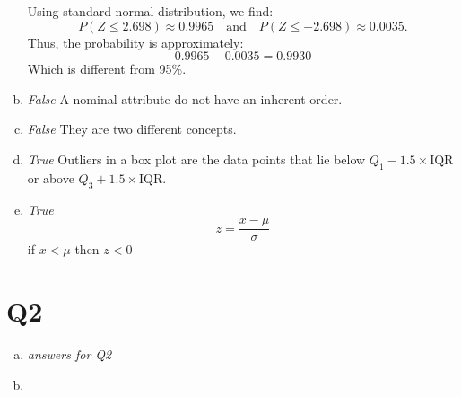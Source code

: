 \documentclass[11pt]{article}
\begin{document}
\begin{enumerate}[a.]
		Using standard normal distribution, we find:
		\[
			P(Z \le 2.698) \approx 0.9965 \quad \text{and} \quad P(Z \le -2.698) \approx 0.0035.
		\]
		Thus, the probability is approximately:
		\[
			0.9965 - 0.0035 = 0.9930 
		\]
		Which is different from 95\%.
	\item
		\textit{False}
		A nominal attribute do not have an inherent order.
	\item
		\textit{False}
		They are two different concepts.
	\item
		\textit{True}
		Outliers in a box plot are the data points that lie below \(Q_1 - 1.5
		\times \text{IQR}\) or above \(Q_3 + 1.5 \times \text{IQR}\).
	\item
		\textit{True}
		\[
			z = \frac{x - \mu}{\sigma}
		\]
		if \(x < \mu\) then \(z < 0\)
\end{enumerate}
\clearpage

\section{Q2}
\begin{enumerate}[a.]
	\item \textit{answers for Q2}

	\item
\end{enumerate}

\clearpage
% 

\end{document}
